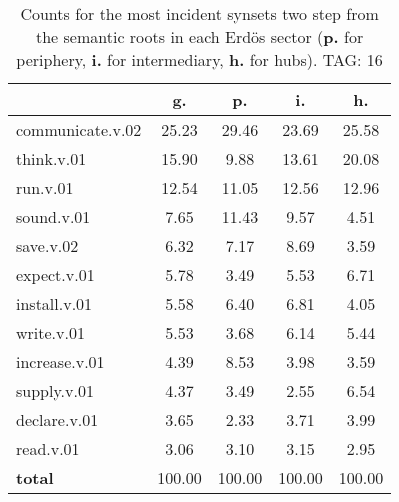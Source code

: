 \begin{table}[h!]
\begin{center}
\begin{tabular}{| l || c | c | c | c |}\hline
 & {\bf g.} & {\bf p.} & {\bf i.} & {\bf h.} \\\hline\hline
communicate.v.02 & 25.23  & 29.46  & 23.69  & 25.58 \\\hline
think.v.01 & 15.90  & 9.88  & 13.61  & 20.08 \\\hline
run.v.01 & 12.54  & 11.05  & 12.56  & 12.96 \\\hline
sound.v.01 & 7.65  & 11.43  & 9.57  & 4.51 \\\hline
save.v.02 & 6.32  & 7.17  & 8.69  & 3.59 \\\hline
expect.v.01 & 5.78  & 3.49  & 5.53  & 6.71 \\\hline
install.v.01 & 5.58  & 6.40  & 6.81  & 4.05 \\\hline
write.v.01 & 5.53  & 3.68  & 6.14  & 5.44 \\\hline
increase.v.01 & 4.39  & 8.53  & 3.98  & 3.59 \\\hline
supply.v.01 & 4.37  & 3.49  & 2.55  & 6.54 \\\hline
declare.v.01 & 3.65  & 2.33  & 3.71  & 3.99 \\\hline
read.v.01 & 3.06  & 3.10  & 3.15  & 2.95 \\\hline\hline
{{\bf total}} & 100.00  & 100.00  & 100.00  & 100.00 \\\hline
\end{tabular}
\caption{Counts for the most incident synsets two step from the semantic roots in each Erd\"os sector ({\bf p.} for periphery, {\bf i.} for intermediary, {\bf h.} for hubs). TAG: 16}
\end{center}
\end{table}